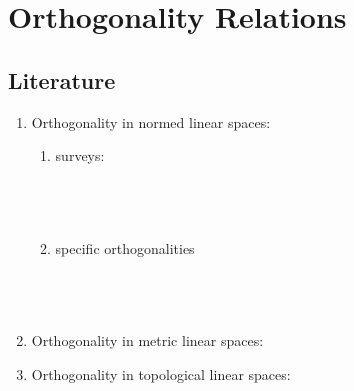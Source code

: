 
\chapter{Orthogonality Relations}












\section{Literature}
\begin{survey}
\begin{enumerate}
  \item Orthogonality in normed linear spaces:
    \begin{enumerate}
      \item surveys:
        \\
        \\
        \\
        \\

      \item specific orthogonalities
        \\
        \\
        \\
        \\

    \end{enumerate}

  \item Orthogonality in metric linear spaces:
    \\

  \item Orthogonality in topological linear spaces:
    \\

\end{enumerate}
\end{survey}


